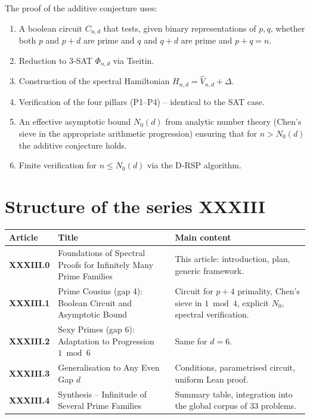 \documentclass[11pt,a4paper]{article}
\begin{document}
The proof of the additive conjecture uses:
\begin{enumerate}
\item A boolean circuit \(C_{n,d}\) that tests, given binary representations of \(p,q\), whether both \(p\) and \(p+d\) are prime and \(q\) and \(q+d\) are prime and \(p+q=n\).
\item Reduction to 3‑SAT \(\Phi_{n,d}\) via Tseitin.
\item Construction of the spectral Hamiltonian \(H_{n,d} = \hat{V}_{n,d} + \Delta\).
\item Verification of the four pillars (P1–P4) – identical to the SAT case.
\item An effective asymptotic bound \(N_0(d)\) from analytic number theory (Chen's sieve in the appropriate arithmetic progression) ensuring that for \(n > N_0(d)\) the additive conjecture holds.
\item Finite verification for \(n \le N_0(d)\) via the D‑RSP algorithm.
\end{enumerate}

\section{Structure of the series XXXIII}

\begin{center}
\small
\begin{tabular}{@{}>{\bfseries}l>{\raggedright\arraybackslash}p{4.5cm}>{\raggedright\arraybackslash}p{6cm}@{}}
\toprule
\textbf{Article} & \textbf{Title} & \textbf{Main content} \\
\midrule
XXXIII.0 & Foundations of Spectral Proofs for Infinitely Many Prime Families & This article: introduction, plan, generic framework. \\
XXXIII.1 & Prime Cousins (gap 4): Boolean Circuit and Asymptotic Bound & Circuit for \(p+4\) primality, Chen's sieve in \(1\bmod4\), explicit \(N_0\), spectral verification. \\
XXXIII.2 & Sexy Primes (gap 6): Adaptation to Progression \(1\bmod6\) & Same for \(d=6\). \\
XXXIII.3 & Generalisation to Any Even Gap \(d\) & Conditions, parametrised circuit, uniform Lean proof. \\
XXXIII.4 & Synthesis – Infinitude of Several Prime Families & Summary table, integration into the global corpus of 33 problems. \\
\bottomrule
\end{tabular}
\normalsize
\end{center}
\end{document}
